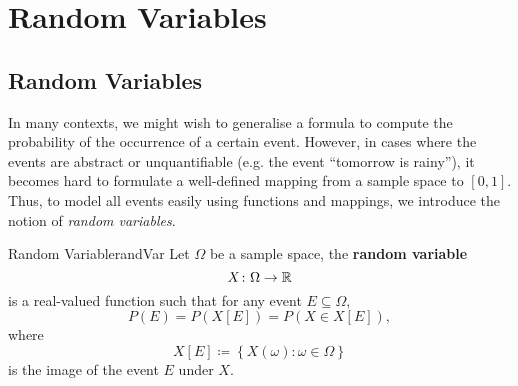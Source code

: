 \documentclass[math]{amznotes}
\theoremstyle{remark}
\begin{document}
\chapter{Random Variables}

\section{Random Variables}
In many contexts, we might wish to generalise a formula to compute the probability of the occurrence of a certain event. However, in cases where the events are abstract or unquantifiable (e.g. the event ``tomorrow is rainy''), it becomes hard to formulate a well-defined mapping from a sample space to $[0, 1]$. Thus, to model all events easily using functions and mappings, we introduce the notion of \textit{random variables}.
\begin{dfnbox}{Random Variable}{randVar}
    Let $\Omega$ be a sample space, the {\color{red} \textbf{random variable}}
    \begin{displaymath}
        X \colon \Omega \to \mathbb{R}
    \end{displaymath}
    is a real-valued function such that for any event $E \subseteq \Omega$, 
    \begin{equation*}
        P(E) = P(X[E]) = P(X \in X[E]),
    \end{equation*}
    where
    \begin{displaymath}
        X[E] \coloneqq \left\{X(\omega) \colon \omega \in \Omega\right\}
    \end{displaymath}
    is the image of the event $E$ under $X$.
\end{dfnbox}
\end{document}
